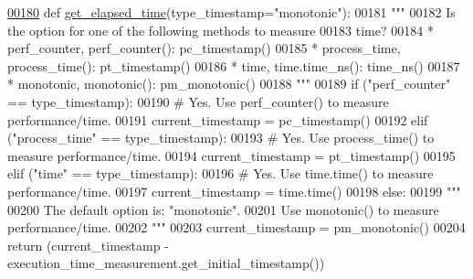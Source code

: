 \begin{DoxyCode}
\hypertarget{classutilities_1_1timing__measurements_1_1performance__measurement__no__ns_1_1execution__time__measurement_l00180}{}\hyperlink{classutilities_1_1timing__measurements_1_1performance__measurement__no__ns_1_1execution__time__measurement_a465918aa8dcf663887149cbf9a7306b9}{00180}     \textcolor{keyword}{def }\hyperlink{classutilities_1_1timing__measurements_1_1performance__measurement__no__ns_1_1execution__time__measurement_a465918aa8dcf663887149cbf9a7306b9}{get\_elapsed\_time}(type\_timestamp="monotonic"):
00181         \textcolor{stringliteral}{"""}
00182 \textcolor{stringliteral}{            Is the option for one of the following methods to measure}
00183 \textcolor{stringliteral}{                time?}
00184 \textcolor{stringliteral}{                * perf\_counter, perf\_counter(): pc\_timestamp()}
00185 \textcolor{stringliteral}{                * process\_time, process\_time(): pt\_timestamp()}
00186 \textcolor{stringliteral}{                * time, time.time\_ns(): time\_ns()}
00187 \textcolor{stringliteral}{                * monotonic, monotonic(): pm\_monotonic()}
00188 \textcolor{stringliteral}{        """}
00189         \textcolor{keywordflow}{if} (\textcolor{stringliteral}{"perf\_counter"} == type\_timestamp):
00190             \textcolor{comment}{# Yes. Use perf\_counter() to measure performance/time.}
00191             current\_timestamp = pc\_timestamp()
00192         \textcolor{keywordflow}{elif} (\textcolor{stringliteral}{"process\_time"} == type\_timestamp):
00193             \textcolor{comment}{# Yes. Use process\_time() to measure performance/time.}
00194             current\_timestamp = pt\_timestamp()
00195         \textcolor{keywordflow}{elif} (\textcolor{stringliteral}{"time"} == type\_timestamp):
00196             \textcolor{comment}{# Yes. Use time.time() to measure performance/time.}
00197             current\_timestamp = time.time()
00198         \textcolor{keywordflow}{else}:
00199             \textcolor{stringliteral}{"""}
00200 \textcolor{stringliteral}{                The default option is: "monotonic".}
00201 \textcolor{stringliteral}{                Use monotonic() to measure performance/time.}
00202 \textcolor{stringliteral}{            """}
00203             current\_timestamp = pm\_monotonic()
00204         \textcolor{keywordflow}{return} (current\_timestamp - execution\_time\_measurement.get\_initial\_timestamp())
\end{DoxyCode}
\hypertarget{classutilities_1_1timing__measurements_1_1performance__measurement__no__ns_1_1execution__time__measurement_af12752f53bfd297b66b504170b9e3655}{}
